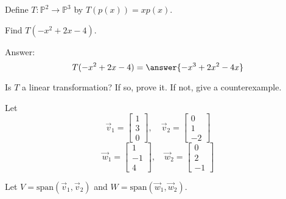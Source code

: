 \documentclass{ximera}
\begin{document}
\begin{problem}
Define $T:\mathbb{P}^2\rightarrow\mathbb{P}^3$ by $T(p(x))=xp(x)$.  

\begin{problem}\label{prob:lintransmultbyx1}
Find $T(-x^2+2x-4)$.

Answer: $$T(-x^2+2x-4)=\answer{-x^3+2x^2-4x}$$
\end{problem}

\begin{problem}\label{prob:lintransmultbyx2}
Is $T$ a linear transformation?  If so, prove it.  If not, give a counterexample.
\end{problem}
\end{problem}

\begin{problem}
Let $$\vec{v}_1=\begin{bmatrix}1\\3\\0\end{bmatrix},\quad \vec{v}_2=\begin{bmatrix}0\\1\\-2\end{bmatrix}$$
$$\vec{w}_1=\begin{bmatrix}1\\-1\\4\end{bmatrix},\quad \vec{w}_2=\begin{bmatrix}0\\2\\-1\end{bmatrix}$$

Let $V=\text{span}(\vec{v}_1, \vec{v}_2)$ and $W=\text{span}(\vec{w}_1, \vec{w}_2)$.


\end{problem}
\end{document}
